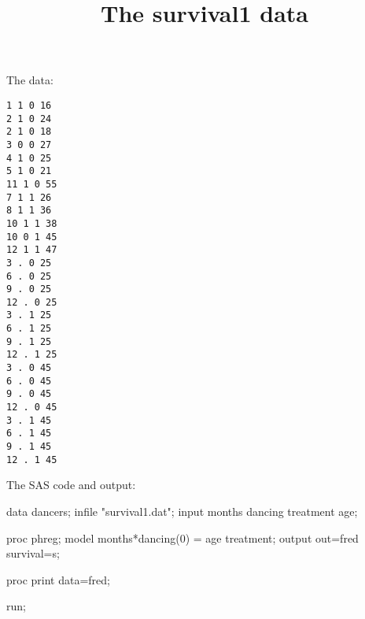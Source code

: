 \documentclass{article}
\title{The survival1 data}
\begin{document}
\maketitle
The data:
\begin{verbatim}
1 1 0 16
2 1 0 24
2 1 0 18
3 0 0 27
4 1 0 25
5 1 0 21
11 1 0 55
7 1 1 26
8 1 1 36
10 1 1 38
10 0 1 45
12 1 1 47
3 . 0 25
6 . 0 25
9 . 0 25
12 . 0 25
3 . 1 25
6 . 1 25
9 . 1 25
12 . 1 25
3 . 0 45
6 . 0 45
9 . 0 45
12 . 0 45
3 . 1 45
6 . 1 45
9 . 1 45
12 . 1 45
\end{verbatim}
The SAS code and output:
\begin{Winput}
data dancers;
  infile "survival1.dat";
  input months dancing treatment age;

proc phreg;
  model months*dancing(0) = age treatment;
  output out=fred survival=s;

proc print data=fred;

run;
\end{Winput}
\end{document}
